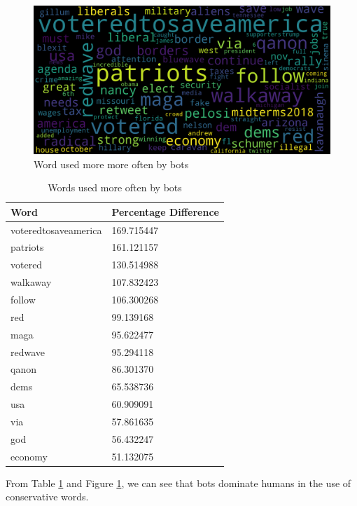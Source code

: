 \documentclass[letterpaper]{article}
\begin{document}
\begin{figure}[h!]
    \includegraphics[width=\linewidth]{images/mostly_bots.png}
    \caption{Word used more more often by bots}
    \label{fig:bots_dominant}
\end{figure}

\begin{table}[H]
    \centering
    \begin{tabular}{|l|l|}
    \hline
    \textbf{Word} & \textbf{Percentage Difference} \\ \hline
    voteredtosaveamerica & 169.715447 \\ \hline
    patriots & 161.121157 \\ \hline
    votered & 130.514988 \\ \hline
    walkaway & 107.832423 \\ \hline
    follow & 106.300268 \\ \hline
    red & 99.139168 \\ \hline
    maga & 95.622477 \\ \hline
    redwave & 95.294118 \\ \hline
    qanon & 86.301370 \\ \hline
    dems & 65.538736 \\ \hline
    usa & 60.909091 \\ \hline
    via & 57.861635 \\ \hline
    god & 56.432247 \\ \hline
    economy & 51.132075 \\ \hline
    \end{tabular}
    \caption{Words used more often by bots}
    \label{tab:bot-dominant-words}
\end{table}

From Table \ref{tab:bot-dominant-words} and Figure \ref{fig:bots_dominant}, we can see that bots dominate humans in the use of conservative words. 
\end{document}

